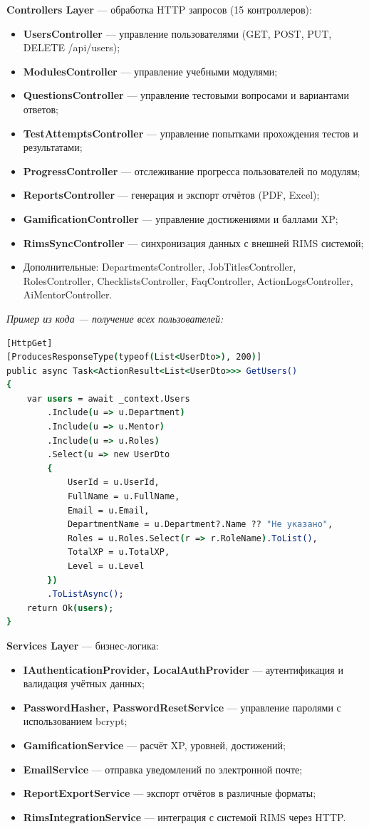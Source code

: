 \textbf{Controllers Layer} --- обработка HTTP запросов (15 контроллеров):
\begin{itemize}
    \item \textbf{UsersController} --- управление пользователями (GET, POST, PUT, DELETE /api/users);
    \item \textbf{ModulesController} --- управление учебными модулями;
    \item \textbf{QuestionsController} --- управление тестовыми вопросами и вариантами ответов;
    \item \textbf{TestAttemptsController} --- управление попытками прохождения тестов и результатами;
    \item \textbf{ProgressController} --- отслеживание прогресса пользователей по модулям;
    \item \textbf{ReportsController} --- генерация и экспорт отчётов (PDF, Excel);
    \item \textbf{GamificationController} --- управление достижениями и баллами XP;
    \item \textbf{RimsSyncController} --- синхронизация данных с внешней RIMS системой;
    \item Дополнительные: DepartmentsController, JobTitlesController, RolesController, ChecklistsController, FaqController, ActionLogsController, AiMentorController.
\end{itemize}

\textit{Пример из кода --- получение всех пользователей:}
\begin{lstlisting}[language=csh, basicstyle=\ttfamily\small]
[HttpGet]
[ProducesResponseType(typeof(List<UserDto>), 200)]
public async Task<ActionResult<List<UserDto>>> GetUsers()
{
    var users = await _context.Users
        .Include(u => u.Department)
        .Include(u => u.Mentor)
        .Include(u => u.Roles)
        .Select(u => new UserDto
        {
            UserId = u.UserId,
            FullName = u.FullName,
            Email = u.Email,
            DepartmentName = u.Department?.Name ?? "Не указано",
            Roles = u.Roles.Select(r => r.RoleName).ToList(),
            TotalXP = u.TotalXP,
            Level = u.Level
        })
        .ToListAsync();
    return Ok(users);
}
\end{lstlisting}

\textbf{Services Layer} --- бизнес-логика:
\begin{itemize}
    \item \textbf{IAuthenticationProvider, LocalAuthProvider} --- аутентификация и валидация учётных данных;
    \item \textbf{PasswordHasher, PasswordResetService} --- управление паролями с использованием bcrypt;
    \item \textbf{GamificationService} --- расчёт XP, уровней, достижений;
    \item \textbf{EmailService} --- отправка уведомлений по электронной почте;
    \item \textbf{ReportExportService} --- экспорт отчётов в различные форматы;
    \item \textbf{RimsIntegrationService} --- интеграция с системой RIMS через HTTP.
\end{itemize}

